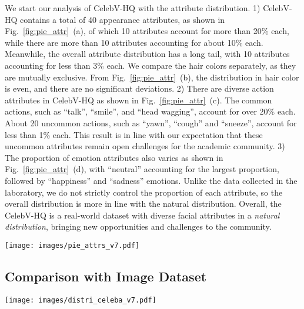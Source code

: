 \documentclass[runningheads]{llncs}
\begin{document}
We start our analysis of CelebV-HQ with the attribute distribution. 
1) CelebV-HQ contains a total of 40 appearance attributes, as shown in Fig.~\ref{fig:pie_attr}~(a), of which 10 attributes account for more than 20\% each, while there are more than 10 attributes accounting for about 10\% each.
Meanwhile, the overall attribute distribution has a long tail, with 10 attributes accounting for less than 3\% each. 
We compare the hair colors separately, as they are mutually exclusive. From Fig.~\ref{fig:pie_attr}~(b), the distribution in hair color is even, and there are no significant deviations. 
2) There are diverse action attributes in CelebV-HQ as shown in Fig.~\ref{fig:pie_attr}~(c). The common actions, such as ``talk'', ``smile'', and ``head wagging'', account for over 20\% each. About 20 uncommon actions, such as ``yawn'', ``cough'' and ``sneeze'', account for less than 1\% each. This result is in line with our expectation that these uncommon attributes remain open challenges for the academic community. 
3) The proportion of emotion attributes also varies as shown in Fig.~\ref{fig:pie_attr}~(d), with ``neutral'' accounting for the largest proportion, followed by ``happiness'' and ``sadness'' emotions. Unlike the data collected in the laboratory, we do not strictly control the proportion of each attribute, so the overall distribution is more in line with the natural distribution. 
Overall, the CelebV-HQ is a real-world dataset with diverse facial attributes in a \textit{natural distribution}, bringing new opportunities and challenges to the community.


\begin{figure*}[t]
\centering
\texttt{[image: images/pie\_attrs\_v7.pdf]}
\caption{\textbf{The distributions of each attribute.} CelebV-HQ has a diverse distribution on each attribute category. (Please zoom in for details).}
\label{fig:pie_attr}
\end{figure*}


\subsection{Comparison with Image Dataset}
\begin{figure*}[t]
\centering
\texttt{[image: images/distri\_celeba\_v7.pdf]}
\caption{\textbf{Distributions of age and ethnicity compared with CelebA-HQ~\cite{celebahq}.} (a) and (b) show that CelebV-HQ has a similar distribution compared to CelebA-HQ~\cite{celebahq}.   
}
\label{fig:attr_dist}
\end{figure*}
\end{document}
